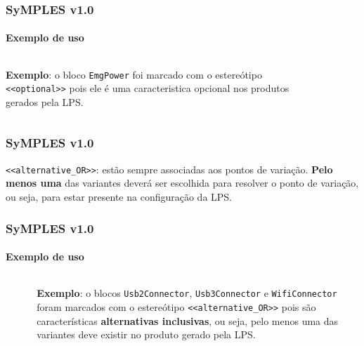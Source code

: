 \begin{frame}
\frametitle{SyMPLES v1.0}
\framesubtitle{Exemplo de uso}

  \begin{columns}[onlytextwidth]
    
    \begin{column}{0.6\textwidth}
      \textbf{Exemplo}: o bloco \texttt{EmgPower} foi marcado com o estereótipo \texttt{<<optional>>} pois ele é uma caracteristica opcional nos produtos gerados pela LPS.
    \end{column}
  
    \begin{column}{0.4\textwidth}
      \begin{figure}
      \end{figure}
    \end{column}
    
  \end{columns}

\end{frame}


\begin{frame}
\frametitle{SyMPLES v1.0}

  \texttt{<<alternative\_OR>>}: estão sempre associadas aos pontos de variação. \textbf{Pelo menos uma} das variantes deverá ser escolhida para resolver o ponto de variação, ou seja, para estar presente na configuração da LPS.

\end{frame}


\begin{frame}
\frametitle{SyMPLES v1.0}
\framesubtitle{Exemplo de uso}

  \begin{columns}[onlytextwidth]
  
    \begin{column}{0.4\textwidth}
      \begin{figure}
      \end{figure}
    \end{column}
    
    \begin{column}{0.6\textwidth}
      \textbf{Exemplo}: o blocos \texttt{Usb2Connector}, \texttt{Usb3Connector} e \texttt{WifiConnector} foram marcados com o estereótipo \texttt{<<alternative\_OR>>} pois são características \textbf{alternativas inclusivas}, ou seja, pelo menos uma das variantes deve existir no produto gerado pela LPS.
    \end{column}
    
  \end{columns}

\end{frame}


